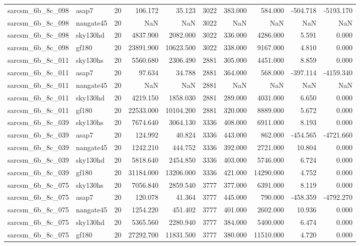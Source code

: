 \documentclass{article}
\begin{document}
\begin{longtable}{llrrrrrrrr}
sarcsm\_6b\_8c\_098 & asap7 & 20 & 106.172 & 35.123 & 3022 & 383.000 & 584.000 & -504.718 & -5193.170 \\
sarcsm\_6b\_8c\_098 & nangate45 & 20 & NaN & NaN & 3022 & NaN & NaN & NaN & NaN \\
sarcsm\_6b\_8c\_098 & sky130hd & 20 & 4837.900 & 2082.000 & 3022 & 336.000 & 4286.000 & 5.591 & 0.000 \\
sarcsm\_6b\_8c\_098 & gf180 & 20 & 23891.900 & 10623.500 & 3022 & 338.000 & 9167.000 & 4.810 & 0.000 \\
sarcsm\_6b\_8c\_011 & sky130hs & 20 & 5560.680 & 2306.490 & 2881 & 305.000 & 4451.000 & 8.859 & 0.000 \\
sarcsm\_6b\_8c\_011 & asap7 & 20 & 97.634 & 34.788 & 2881 & 364.000 & 568.000 & -397.114 & -4159.340 \\
sarcsm\_6b\_8c\_011 & nangate45 & 20 & NaN & NaN & 2881 & NaN & NaN & NaN & NaN \\
sarcsm\_6b\_8c\_011 & sky130hd & 20 & 4219.150 & 1858.030 & 2881 & 289.000 & 4031.000 & 6.650 & 0.000 \\
sarcsm\_6b\_8c\_011 & gf180 & 20 & 22533.000 & 10104.200 & 2881 & 320.000 & 8889.000 & 5.672 & 0.000 \\
sarcsm\_6b\_8c\_039 & sky130hs & 20 & 7674.640 & 3064.130 & 3336 & 408.000 & 6911.000 & 8.193 & 0.000 \\
sarcsm\_6b\_8c\_039 & asap7 & 20 & 124.992 & 40.824 & 3336 & 443.000 & 862.000 & -454.565 & -4721.660 \\
sarcsm\_6b\_8c\_039 & nangate45 & 20 & 1242.210 & 444.752 & 3336 & 392.000 & 2721.000 & 10.804 & 0.000 \\
sarcsm\_6b\_8c\_039 & sky130hd & 20 & 5818.640 & 2454.850 & 3336 & 403.000 & 5746.000 & 6.724 & 0.000 \\
sarcsm\_6b\_8c\_039 & gf180 & 20 & 31184.000 & 13206.000 & 3336 & 421.000 & 14290.000 & 4.752 & 0.000 \\
sarcsm\_6b\_8c\_075 & sky130hs & 20 & 7056.840 & 2859.540 & 3777 & 377.000 & 6391.000 & 8.119 & 0.000 \\
sarcsm\_6b\_8c\_075 & asap7 & 20 & 120.078 & 41.364 & 3777 & 445.000 & 790.000 & -458.359 & -4792.270 \\
sarcsm\_6b\_8c\_075 & nangate45 & 20 & 1254.220 & 451.402 & 3777 & 401.000 & 2602.000 & 10.936 & 0.000 \\
sarcsm\_6b\_8c\_075 & sky130hd & 20 & 5365.560 & 2280.940 & 3777 & 384.000 & 5400.000 & 6.474 & 0.000 \\
sarcsm\_6b\_8c\_075 & gf180 & 20 & 27292.700 & 11831.500 & 3777 & 380.000 & 11510.000 & 4.720 & 0.000 \\

\end{longtable}
\end{document}
